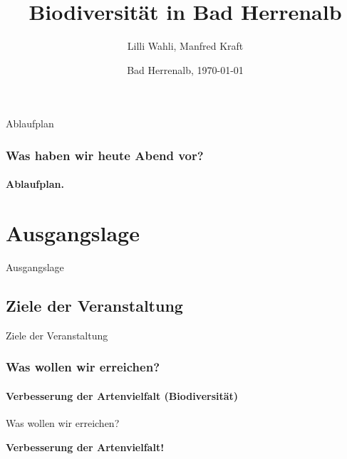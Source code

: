 \documentclass[aspectratio=169]{beamer}
\begin{document}

\author[Manfred]{Lilli Wahli, Manfred Kraft}
\title[Biodiversität]{Biodiversität in Bad Herrenalb}
\date{Bad Herrenalb, \today}
\frame{\titlepage}


\begin{frame}{Ablaufplan}
\frametitle{Was haben wir heute Abend vor?} 
\framesubtitle{Ablaufplan.}
\tableofcontents[hideallsubsections]
\end{frame}


\section{Ausgangslage}

\begin{frame}{Ausgangslage}
\end{frame}


\subsection[Ziele]{Ziele der Veranstaltung}

\begin{frame}{Ziele der Veranstaltung}
\frametitle{Was wollen wir erreichen?} 
\framesubtitle{Verbesserung der Artenvielfalt (Biodiversität)}

\begin{block}{Was wollen wir erreichen?}
\begin{center}	
		\textbf{Verbesserung der Artenvielfalt!}
	\end{center}
\end{block}
\end{frame}
\end{document}
